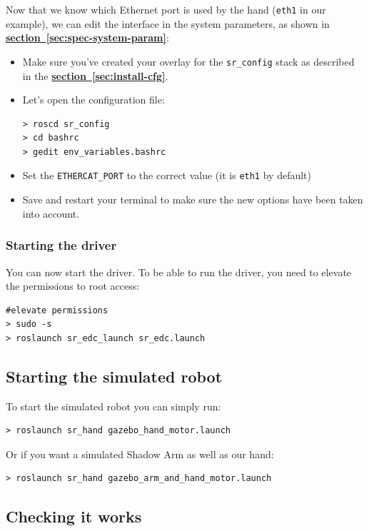 \documentclass[12pt]{article}
\newcommand{\link}[1]{\hyperref[sec:#1]{\textbf{section~\ref*{sec:#1}}}}
\begin{document}
\par Now that we know which Ethernet port is used by the hand (\texttt{eth1} in our example), we can edit the interface in the system parameters, as shown in \link{spec-system-param}:
\begin{itemize}
\item Make sure you've created your overlay for the \texttt{sr\_config} stack as described in the \link{install-cfg}.
\item Let's open the configuration file:
  \begin{lstlisting}[escapeinside='']
> roscd sr_config
> cd bashrc
> gedit env_variables.bashrc
  \end{lstlisting}
\item Set the \texttt{ETHERCAT\_PORT} to the correct value (it is \texttt{eth1} by default)
\item Save and restart your terminal to make sure the new options have been taken into account.
\end{itemize}

\subsubsection{Starting the driver}
\par You can now start the driver. To be able to run the driver, you need to elevate the permissions to root access:
  \begin{lstlisting}[escapeinside='']
#elevate permissions
> sudo -s
> roslaunch sr_edc_launch sr_edc.launch
  \end{lstlisting}

\subsection{Starting the simulated robot}
\label{sec:start-simul-hand}
\par To start the simulated robot you can simply run:
  \begin{lstlisting}[escapeinside='']
> roslaunch sr_hand gazebo_hand_motor.launch
  \end{lstlisting}

\par Or if you want a simulated Shadow Arm as well as our hand:
  \begin{lstlisting}[escapeinside='']
> roslaunch sr_hand gazebo_arm_and_hand_motor.launch
  \end{lstlisting}

\subsection{Checking it works}
\label{sec:checking-it-works}
\end{document}

